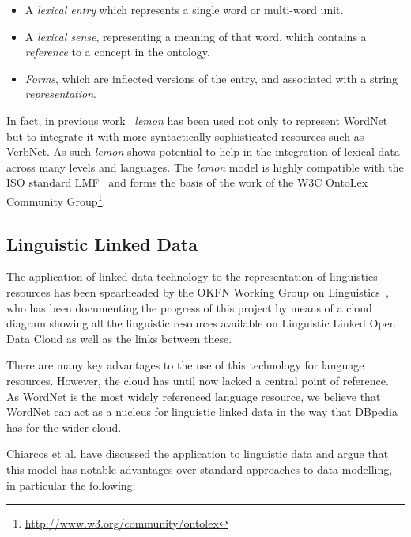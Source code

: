 \documentclass[10pt, a4paper]{article}
\newcommand{\lemon}[0]{\emph{lemon}}
\begin{document}
\begin{itemize}
  \item A \emph{lexical entry} which represents a single word or multi-word
    unit.
  \item A \emph{lexical sense}, representing a meaning of that word, which
    contains a \emph{reference} to a concept in the ontology.
  \item \emph{Forms}, which are inflected versions of the entry, and associated
    with a string \emph{representation}.
\end{itemize}

In fact, in previous work~\cite{eckle2014lemonuby} \lemon{} has been used not only to
represent WordNet but to integrate it with more syntactically sophisticated
resources such as VerbNet. As such \lemon{} shows potential to help in the
integration of lexical data across many levels and languages. The \lemon{} model
is highly compatible with the ISO standard LMF~\cite{francopoulo2006lexical} and
forms the basis of the work of the W3C OntoLex Community
Group\footnote{\url{http://www.w3.org/community/ontolex}}.

\subsection{Linguistic Linked Data}

The application of linked data technology to the representation of linguistics
resources has been spearheaded by the OKFN Working Group on Linguistics~\cite{chiarcos2011towards},
who has been documenting the progress of this project by means of a cloud
diagram showing all the linguistic resources available on Linguistic Linked Open Data Cloud as well as the links between these.

There are many key advantages to the use
of this technology for language resources. However, the cloud has until now
lacked a central point of reference. As WordNet is the most widely referenced language
resource, we believe that WordNet can act as a nucleus for linguistic linked data
in the way that DBpedia~\cite{auer2007dbpedia} has for the wider cloud.

Chiarcos et al. \cite{chiarcos2013towards} have discussed the
application to linguistic data and argue that this model has notable
advantages over standard approaches to data modelling, in particular the following:
\end{document}
